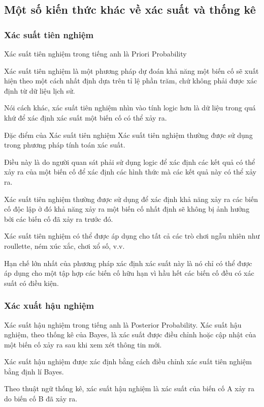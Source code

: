 \documentclass[a4paper]{article}
\begin{document}
\subsection{Một số kiến thức khác về xác suất và thống kê}

\subsubsection{Xác suất tiên nghiệm}
Xác suất tiên nghiệm trong tiếng anh là Priori Probability

Xác suất tiên nghiệm là một phương pháp dự đoán khả năng một biến cố sẽ xuất hiện theo một cách nhất định dựa trên tỉ lệ phần trăm, chứ không phải được xác định từ dữ liệu lịch sử. 

Nói cách khác, xác suất tiên nghiệm nhìn vào tính logic hơn là dữ liệu trong quá khứ để xác định xác suất một biến cố có thể xảy ra.   

Đặc điểm của Xác suất tiên nghiệm 
Xác suất tiên nghiệm thường được sử dụng trong phương pháp tính toán xác suất. 

Điều này là do người quan sát phải sử dụng logic để xác định các kết quả có thể xảy ra của một biến cố để xác định các hình thức mà các kết quả này có thể xảy ra.

Xác suất tiên nghiệm thường được sử dụng để xác định khả năng xảy ra các biến cố độc lập ở đó khả năng xảy ra một biến cố nhất định sẽ không bị ảnh hưởng bởi các biến cố đã xảy ra trước đó.

Xác suất tiên nghiệm có thể được áp dụng cho tất cả các trò chơi ngẫu nhiên như roullette, ném xúc xắc, chơi xổ số, v.v.

Hạn chế lớn nhất của phương pháp xác định xác suất này là nó chỉ có thể được áp dụng cho một tập hợp các biến cố hữu hạn vì hầu hết các biến cố đều có xác suất có điều kiện.


\subsubsection{Xác xuất hậu nghiệm}
Xác suất hậu nghiệm trong tiếng anh là Posterior Probability.
Xác suất hậu nghiệm, theo thống kê của Bayes, là xác suất được điều chỉnh hoặc cập nhật của một biến cố xảy ra sau khi xem xét thông tin mới. 

Xác suất hậu nghiệm được xác định bằng cách điều chỉnh xác suất tiên nghiệm bằng định lí Bayes. 

Theo thuật ngữ thống kê, xác suất hậu nghiệm là xác suất của biến cố A xảy ra do biến cố B đã xảy ra. 
\end{document}
